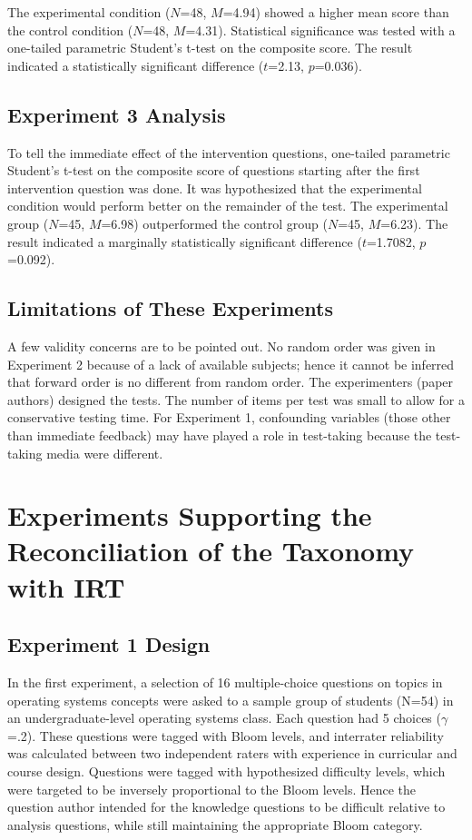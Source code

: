 The experimental condition ($N$=48, $M$=4.94) showed a higher mean score than
the control condition ($N$=48, $M$=4.31).  Statistical significance was tested
with a one-tailed parametric Student's t-test on the composite score.  The
result indicated a statistically significant difference ($t$=2.13, $p$=0.036).

\subsection{Experiment 3 Analysis}

To tell the immediate effect of the intervention questions, one-tailed
parametric Student's t-test on the composite score of questions starting after
the first intervention question was done. It was hypothesized that the
experimental condition would perform better on the remainder of the test. The
experimental group ($N$=45, $M$=6.98) outperformed the control group ($N$=45,
$M$=6.23).  The result indicated a marginally statistically significant
difference ($t$=1.7082, $p$=0.092).

\subsection{Limitations of These Experiments}

A few validity concerns are to be pointed out. No random order was given in
Experiment 2 because of a lack of available subjects; hence it cannot be
inferred that forward order is no different from random order. The
experimenters (paper authors) designed the tests. The number of items per test
was small to allow for a conservative testing time.  For Experiment 1,
confounding variables (those other than immediate feedback) may have played a
role in test-taking because the test-taking media were different.


\section{Experiments Supporting the Reconciliation of the Taxonomy with IRT}

\subsection{Experiment 1 Design}

In the first experiment, a selection of 16 multiple-choice questions on topics
in operating systems concepts were asked to a sample group of students (N=54)
in an undergraduate-level operating systems class.  Each question had 5 choices
($\gamma$=.2). These questions were tagged with Bloom levels, and interrater
reliability was calculated between two independent raters with experience in
curricular and course design.  Questions were tagged with hypothesized
difficulty levels, which were targeted to be inversely proportional to the
Bloom levels.  Hence the question author intended for the knowledge questions
to be difficult relative to analysis questions, while still maintaining the
appropriate Bloom category.

